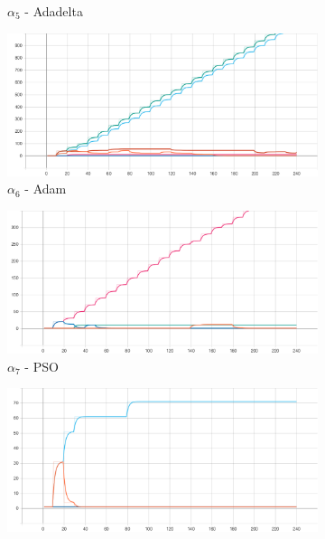 \begin{figure}[htbp]
\begin{subfigure}{0.5\textwidth}
        \caption{$\alpha_{5}$ - \Acs{Adadelta}}
        \label{fig:results:case_study:iris:alpha:5}
    \end{subfigure}
    \par\bigskip
    \begin{subfigure}{0.5\textwidth}
        \centering
        \includegraphics[width=\textwidth]{analysis/bhh_case_study/iris/alpha[6].png}
        \caption{$\alpha_{6}$ - \Acs{Adam}}
        \label{fig:results:case_study:iris:alpha:6}
    \end{subfigure}
    \begin{subfigure}{0.5\textwidth}
        \centering
        \includegraphics[width=\textwidth]{analysis/bhh_case_study/iris/alpha[7].png}
        \caption{$\alpha_{7}$ - \Acs{PSO}}
        \label{fig:results:case_study:iris:alpha:7}
    \end{subfigure}
    \par\bigskip
    \begin{subfigure}{0.5\textwidth}
        \centering
        \includegraphics[width=\textwidth]{analysis/bhh_case_study/iris/alpha[8].png}

\end{subfigure}
\end{figure}
